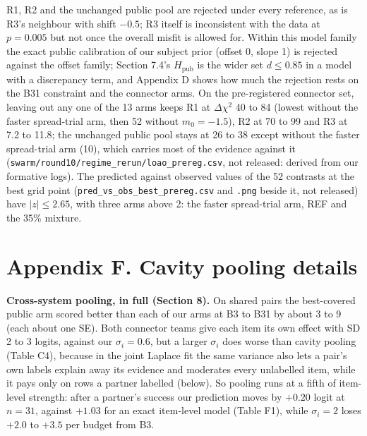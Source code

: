 \documentclass[
]{article}
\begin{document}
R1, R2 and the unchanged public pool are rejected under every reference,
as is R3's neighbour with shift \(-0.5\); R3 itself is inconsistent with
the data at \(p = 0.005\) but not once the overall misfit is allowed
for. Within this model family the exact public calibration of our
subject prior (offset 0, slope 1) is rejected against the offset family;
Section 7.4's \(H_{\mathrm{pub}}\) is the wider set \(d \le 0.85\) in a
model with a discrepancy term, and Appendix D shows how much the
rejection rests on the B31 constraint and the connector arms. On the
pre-registered connector set, leaving out any one of the 13 arms keeps
R1 at \(\Delta\chi^2\) 40 to 84 (lowest without the faster spread-trial
arm, then 52 without \(m_0 = -1.5\)), R2 at 70 to 99 and R3 at 7.2 to
11.8; the unchanged public pool stays at 26 to 38 except without the
faster spread-trial arm (10), which carries most of the evidence against
it (\texttt{swarm/round10/regime\_rerun/loao\_prereg.csv}, not released:
derived from our formative logs). The predicted against observed values
of the 52 contrasts at the best grid point
(\texttt{pred\_vs\_obs\_best\_prereg.csv} and \texttt{.png} beside it,
not released) have \(|z| \le 2.65\), with three arms above 2: the faster
spread-trial arm, REF and the 35\% mixture.

\section{Appendix F. Cavity pooling
details}\label{appendix-f.-cavity-pooling-details}

\textbf{Cross-system pooling, in full (Section 8).} On shared pairs the
best-covered public arm scored better than each of our arms at B3 to B31
by about 3 to 9 (each about one SE). Both connector teams give each item
its own effect with SD 2 to 3 logits, against our \(\sigma_i = 0.6\),
but a larger \(\sigma_i\) does worse than cavity pooling (Table C4),
because in the joint Laplace fit the same variance also lets a pair's
own labels explain away its evidence and moderates every unlabelled
item, while it pays only on rows a partner labelled (below). So pooling
runs at a fifth of item-level strength: after a partner's success our
prediction moves by \(+0.20\) logit at \(n = 31\), against \(+1.03\) for
an exact item-level model (Table F1), while \(\sigma_i = 2\) loses
\(+2.0\) to \(+3.5\) per budget from B3.
\end{document}
